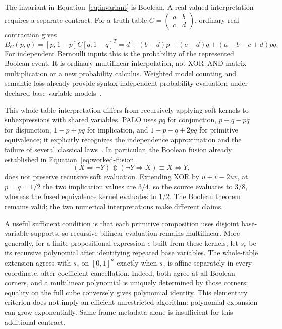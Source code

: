 \documentclass[10pt]{article}
\newcommand{\bxor}{\mathbin{\Updownarrow}}
\theoremstyle{plain}
\theoremstyle{definition}
\theoremstyle{remark}
\begin{document}
The invariant in Equation~\eqref{eq:invariant} is Boolean. A real-valued interpretation requires a separate contract. For a truth table $C=\left(\begin{smallmatrix}a&b\\c&d\end{smallmatrix}\right)$, ordinary real contraction gives
\begin{equation}
 B_C(p,q)=[p,1-p]C[q,1-q]^T
 =d+(b-d)p+(c-d)q+(a-b-c+d)pq.
 \label{eq:soft-contraction}
\end{equation}
For independent Bernoulli inputs this is the probability of the represented Boolean event. It is ordinary multilinear interpolation, not XOR--AND matrix multiplication or a new probability calculus. Weighted model counting and semantic loss already provide syntax-independent probability evaluation under declared base-variable models~\cite{Kimmig2017,Xu2018}.

This whole-table interpretation differs from recursively applying soft kernels to subexpressions with shared variables. PALO uses $pq$ for conjunction, $p+q-pq$ for disjunction, $1-p+pq$ for implication, and $1-p-q+2pq$ for primitive equivalence; it explicitly recognizes the independence approximation and the failure of several classical laws~\cite[Sections~3.2, 3.5--3.6]{Stehr2022}. In particular, the Boolean fusion already established in Equation~\eqref{eq:worked-fusion},
\[
 (X\Rightarrow\neg Y)\bxor(\neg Y\Rightarrow X)\equiv X\Leftrightarrow Y,
\]
does not preserve recursive soft evaluation. Extending XOR by $u+v-2uv$, at $p=q=1/2$ the two implication values are $3/4$, so the source evaluates to $3/8$, whereas the fused equivalence kernel evaluates to $1/2$. The Boolean theorem remains valid; the two numerical interpretations make different claims.

A useful sufficient condition is that each primitive composition uses disjoint base-variable supports, so recursive bilinear evaluation remains multilinear. More generally, for a finite propositional expression $e$ built from these kernels, let $s_e$ be its recursive polynomial after identifying repeated base variables. The whole-table extension agrees with $s_e$ on $[0,1]^n$ exactly when $s_e$ is affine separately in every coordinate, after coefficient cancellation. Indeed, both agree at all Boolean corners, and a multilinear polynomial is uniquely determined by those corners; equality on the full cube conversely gives polynomial identity. This elementary criterion does not imply an efficient unrestricted algorithm: polynomial expansion can grow exponentially. Same-frame metadata alone is insufficient for this additional contract.
\end{document}
